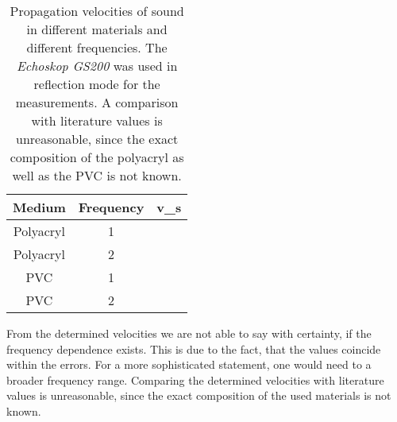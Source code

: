 \documentclass[a4paper,10pt,twocolumn]{article}
\begin{document}
    \begin{table}[htbp]          %
        \centering
        \begin{tabular*}{0.9\linewidth}{@{\extracolsep{\fill}}ccc}
            \hline
            \hline
            \rule[-7pt]{0pt}{23pt} Medium & Frequency  &  v_s 	 \\
            \hline
            \rule[-5pt]{0pt}{23pt}   Polyacryl & 1   &  \polyVelocityRuntimeMeasurementsOneMHz   	 \\
            \rule[-5pt]{0pt}{23pt}   Polyacryl & 2   & \polyVelocityRuntimeMeasurementsTwoMHz    	 \\
            \rule[-5pt]{0pt}{23pt}   PVC & 1  &   \PVCVelocityRuntimeMeasurementsOneMHz  	 \\
            \rule[-5pt]{0pt}{23pt}   PVC  & 2 &   \PVCVelocityRuntimeMeasurementsTwoMHz 	 \\
            \hline
            \hline
        \end{tabular*}
        \normalsize
        \caption[]{Propagation velocities of sound in different materials and different frequencies.
        The \textit{Echoskop GS200} was used in reflection mode for the measurements. A comparison with literature values is unreasonable, since
        the exact composition of the polyacryl as well as the PVC is not known.}  %
        \label{tab:FittedExponent}                             %
    \end{table}
    From the determined velocities we are not able to say with certainty, if the frequency dependence exists.
    This is due to the fact, that the values coincide within the errors.
    For a more sophisticated statement, one would need to a broader frequency range.
    Comparing the determined velocities with literature values is unreasonable, since the exact composition of the used materials is not known.
    
    
    
\end{document}
